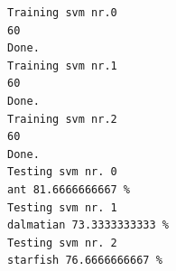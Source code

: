 \documentclass{report}
\begin{document}
\begin{verbatim}
Training svm nr.0                                                                                                                                                                                           
60                                                                                                                                                                                                           
Done.                                                                                                                                                                                                        
Training svm nr.1                                                                                                                                                                                           
60                                                                                                                                                                                                           
Done.                                                                                                                                                                                                        
Training svm nr.2                                                                                                                                                                                           
60                                                                                                                                                                                                           
Done.                                                                                                                                                                                                        
Testing svm nr. 0                                                                                                                                                                                            
ant 81.6666666667 %                                                                                                                                                                                          
Testing svm nr. 1                                                                                                                                                                                            
dalmatian 73.3333333333 %                                                                                                                                                                                    
Testing svm nr. 2                                                                                                                                                                                            
starfish 76.6666666667 %     
\end{verbatim}
\end{document}
